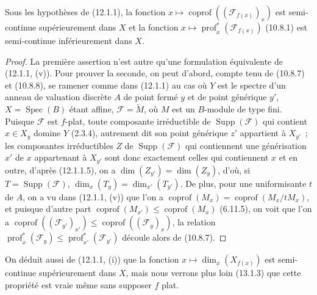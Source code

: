 \begin{corollary}[12.1.3]
\label{IV.12.1.3-fr}
Sous les hypothèses de (12.1.1), la fonction
$x\mapsto\operatorname{coprof}((\mathcal F_{f(x)})_x)$ est semi-continue
supérieurement dans $X$ et la fonction
$x\mapsto\operatorname{prof}_x^*(\mathcal F_{f(x)})$ (10.8.1) est
semi-continue inférieurement dans $X$.
\end{corollary}

\begin{proof}
La première assertion n'est autre qu'une formulation équivalente de (12.1.1,
(v)). Pour prouver la seconde, on peut d'abord, compte tenu de (10.8.7) et
(10.8.8), se ramener comme dans (12.1.1) au cas où $Y$ est le spectre d'un
anneau de valuation discrète $A$ de point fermé $y$ et de point générique $y'$,
$X=\operatorname{Spec}(B)$ étant affine, $\mathcal F=\widetilde M$, où $M$ est
un $B$-module de type fini. Puisque $\mathcal F$ est $f$-plat, toute composante
irréductible de $\operatorname{Supp}(\mathcal F)$ qui contient $x\in X_y$
domine $Y$ (2.3.4), autrement dit son point générique $z'$ appartient à
$X_{y'}$~; les composantes irréductibles $Z$ de
$\operatorname{Supp}(\mathcal F)$ qui contiennent une générisation $x'$ de
$x$ appartenant à $X_{y'}$ sont donc exactement celles qui contiennent $x$ et
en outre, d'après (12.1.1.5), on a $\dim(Z_{y'})=\dim(Z_y)$, d'où, si
$T=\operatorname{Supp}(\mathcal F)$,
$\dim_x(T_y)=\dim_{x'}(T_{y'})$. De plus, pour une uniformisante $t$ de $A$, on
a vu dans (12.1.1, (v)) que l'on a
$\operatorname{coprof}(M_x)=\operatorname{coprof}(M_x/tM_x)$, et puisque
d'autre part $\operatorname{coprof}(M_{x'})\leq\operatorname{coprof}(M_x)$
(6.11.5), on voit que l'on a
$\operatorname{coprof}((\mathcal F_{y'})_{x'})\leq
\operatorname{coprof}((\mathcal F_y)_x)$, la relation
$\operatorname{prof}_x^*(\mathcal F_y)\leq
\operatorname{prof}_{x'}^*(\mathcal F_{y'})$ découle alors de (10.8.7).
\end{proof}

\begin{remark}[12.1.4]
\label{IV.12.1.4-fr}
On déduit aussi de (12.1.1, (i)) que la fonction
$x\mapsto\dim_x(X_{f(x)})$ est semi-continue supérieurement dans $X$, mais
nous verrons plus loin (13.1.3) que cette propriété est vraie même sans
supposer $f$ plat.
\end{remark}

